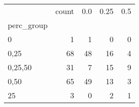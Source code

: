 \begin{tabular}{lrrrr}
\toprule
{} &  count &  0.0 &  0.25 &  0.5 \\
perc\_group &        &      &       &      \\
\midrule
0          &      1 &    1 &     0 &    0 \\
0,25       &     68 &   48 &    16 &    4 \\
0,25,50    &     31 &    7 &    15 &    9 \\
0,50       &     65 &   49 &    13 &    3 \\
25         &      3 &    0 &     2 &    1 \\
\bottomrule
\end{tabular}
